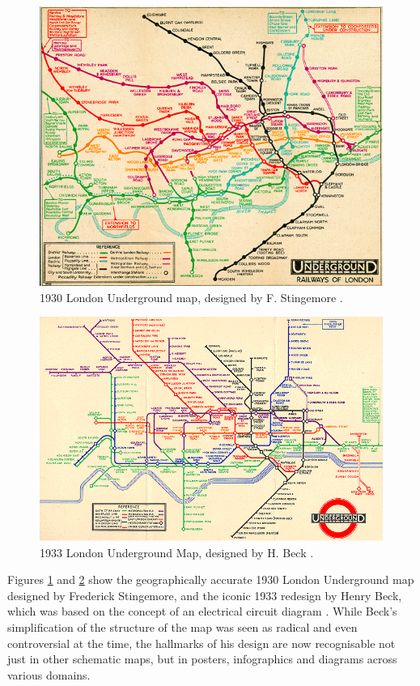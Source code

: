 \begin{figure}[hp!]
	\centering
	\includegraphics[width=.8\textwidth]{img/lit-survey/1930-pre-beck.png}
	\caption{1930 London Underground map, designed by F. Stingemore \citep{Tube150}.}
	\label{fig:pre-beck}
\end{figure}

\begin{figure}[hp!]
	\centering
	\includegraphics[width=.8\textwidth]{img/lit-survey/1933-beck.png}
	\caption{1933 London Underground Map, designed by H. Beck \citep{Tube150}.}
	\label{fig:beck}
\end{figure}

Figures \ref{fig:pre-beck} and \ref{fig:beck} show the geographically accurate 1930 London Underground map designed by Frederick Stingemore, and the iconic 1933 redesign by Henry Beck, which was based on the concept of an electrical circuit diagram \citep{HarryBeck}. While Beck's simplification of the structure of the map was seen as radical and even controversial at the time, the hallmarks of his design are now recognisable not just in other schematic maps, but in posters, infographics and diagrams across various domains.

